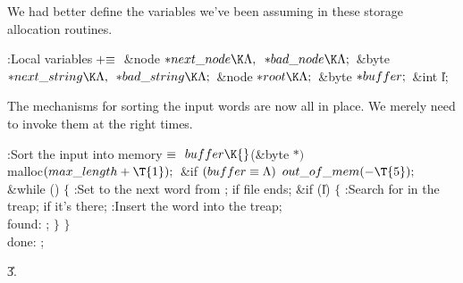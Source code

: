 We had better define the variables we've been assuming in these
storage allocation routines.

\Y\B\4:Local variables\X${}\mathrel+\equiv{}$\6
\&{node} ${}{*}\\{next\_node}\K\NULL,{}$ ${}{*}\\{bad\_node}\K\NULL;{}$\6
\&{byte} ${}{*}\\{next\_string}\K\NULL,{}$ ${}{*}\\{bad\_string}\K\NULL;{}$\6
\&{node} ${}{*}\\{root}\K\NULL;{}$\6
\&{byte} ${}{*}\\{buffer};{}$\6
\&{int} \|l;\par
\fi

The mechanisms for sorting the input words are now all in place.
We merely need to invoke them at the right times.

\Y\B\4:Sort the input into memory\X${}\equiv{}$\6
$\\{buffer}\K{}$(\&{byte} ${}{*}){}$ \\{malloc}${}(\\{max\_length}+\T{1});{}$\6
\&{if} ${}(\\{buffer}\equiv\Lambda){}$\1\5
${}\\{out\_of\_mem}({-}\T{5});{}$\2\6
\&{while} ()\5
${}\{{}$\1\6
:Set  to the next word from ;  if file ends\X;\6
\&{if} (\|l)\5
${}\{{}$\1\6
:Search for  in the treap;  if it's
there\X;\6
:Insert the  word into the treap\X;\6
\4\\{found}:\5
;\6
\4${}\}{}$\2\6
\4${}\}{}$\2\6
\4\\{done}:\5
;\par
\U3.\fi

